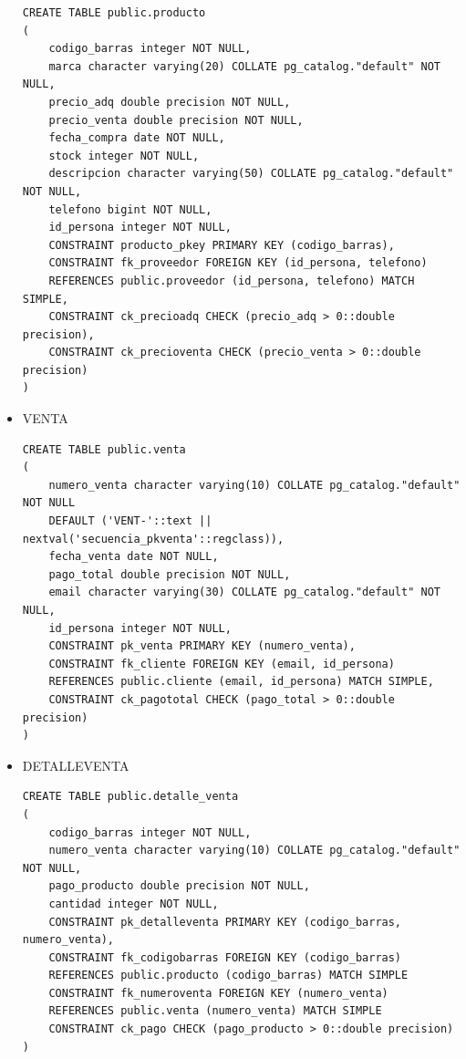 \documentclass{article}
\begin{document}
\begin{itemize}
\begin{lstlisting}
CREATE TABLE public.producto
(
	codigo_barras integer NOT NULL,
	marca character varying(20) COLLATE pg_catalog."default" NOT NULL,
	precio_adq double precision NOT NULL,
	precio_venta double precision NOT NULL,
	fecha_compra date NOT NULL,
	stock integer NOT NULL,
	descripcion character varying(50) COLLATE pg_catalog."default" NOT NULL,
	telefono bigint NOT NULL,
	id_persona integer NOT NULL,
	CONSTRAINT producto_pkey PRIMARY KEY (codigo_barras),
	CONSTRAINT fk_proveedor FOREIGN KEY (id_persona, telefono)
	REFERENCES public.proveedor (id_persona, telefono) MATCH SIMPLE,
	CONSTRAINT ck_precioadq CHECK (precio_adq > 0::double precision),
	CONSTRAINT ck_precioventa CHECK (precio_venta > 0::double precision)
)
\end{lstlisting}

\item VENTA\\

\begin{lstlisting}
CREATE TABLE public.venta
(
	numero_venta character varying(10) COLLATE pg_catalog."default" NOT NULL 
	DEFAULT ('VENT-'::text || nextval('secuencia_pkventa'::regclass)),
	fecha_venta date NOT NULL,
	pago_total double precision NOT NULL,
	email character varying(30) COLLATE pg_catalog."default" NOT NULL,
	id_persona integer NOT NULL,
	CONSTRAINT pk_venta PRIMARY KEY (numero_venta),
	CONSTRAINT fk_cliente FOREIGN KEY (email, id_persona)
	REFERENCES public.cliente (email, id_persona) MATCH SIMPLE,
	CONSTRAINT ck_pagototal CHECK (pago_total > 0::double precision)
)
\end{lstlisting}

\item DETALLE\textunderscore VENTA\\

\begin{lstlisting}
CREATE TABLE public.detalle_venta
(
	codigo_barras integer NOT NULL,
	numero_venta character varying(10) COLLATE pg_catalog."default" NOT NULL,
	pago_producto double precision NOT NULL,
	cantidad integer NOT NULL,
	CONSTRAINT pk_detalleventa PRIMARY KEY (codigo_barras, numero_venta),
	CONSTRAINT fk_codigobarras FOREIGN KEY (codigo_barras)
	REFERENCES public.producto (codigo_barras) MATCH SIMPLE
	CONSTRAINT fk_numeroventa FOREIGN KEY (numero_venta)
	REFERENCES public.venta (numero_venta) MATCH SIMPLE
	CONSTRAINT ck_pago CHECK (pago_producto > 0::double precision)
)
\end{lstlisting}
\end{itemize} 
\end{document}
